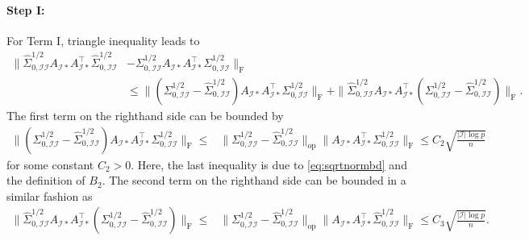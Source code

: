 \documentclass[11pt]{article}
\newcommand{\cI}{{\mathcal{I}}}
\newcommand{\0}{{\mathbf{0}}}
\newcommand{\op}{{\mathrm{op}}}
\begin{document}
\paragraph{Step I:} 
For Term I,
triangle inequality leads to
\begin{align*} 
 \|\widehat{\Sigma}_{0,\cI\cI}^{1/2}A_{\cI*}A^\top  _{\cI*}\widehat{\Sigma}_{0,\cI\cI}^{1/2} & -\Sigma_{0,\cI\cI}^{1/2}A_{\cI*}A^\top  _{\cI*}\Sigma_{0,\cI\cI}^{1/2}\|_\mathrm{F}\\
 & \leq \|(\Sigma_{0,\cI\cI}^{1/2}-\widehat{\Sigma}_{0,\cI\cI}^{1/2})A_{\cI*}A^\top  _{\cI*}\Sigma_{0,\cI\cI}^{1/2}\|_\mathrm{F} +\|\widehat{\Sigma}_{0,\cI\cI}^{1/2}A_{\cI*}A^\top_{\cI*}(\Sigma_{0,\cI\cI}^{1/2}-\widehat{\Sigma}_{0,\cI\cI}^{1/2})\|_\mathrm{F}.
\end{align*}
The first term on the righthand side can be bounded by \begin{align*}
    \|(\Sigma_{0,\cI\cI}^{1/2}-\widehat{\Sigma}_{0,\cI\cI}^{1/2})A_{\cI*}A^\top  _{\cI*}\Sigma_{0,\cI\cI}^{1/2}\|_\mathrm{F}\leq &\|\Sigma_{0,\cI\cI}^{1/2}-\widehat{\Sigma}_{0,\cI\cI}^{1/2}\|_{\op}\|A_{\cI*}A^\top_{\cI*}\Sigma_{0,\cI\cI}^{1/2}\|_\mathrm{F}
    \leq C_2\sqrt{\frac{|\cI|\log p}{n}}
\end{align*}
for some constant $C_2>0$.
Here, the last inequality is due to \eqref{eq:sqrtnormbd} and the definition of $B_2$. 
The second term on the righthand side can be bounded in a similar fashion as 
\begin{align*}
\|\widehat{\Sigma}_{0,\cI\cI}^{1/2}A_{\cI*}A^\top_{\cI*}(\Sigma_{0,\cI\cI}^{1/2}-\widehat{\Sigma}_{0,\cI\cI}^{1/2})\|_\mathrm{F}
      \leq &\|\Sigma_{0,\cI\cI}^{1/2}-\widehat{\Sigma}_{0,\cI\cI}^{1/2}\|_{\op}\|A_{\cI*}A^\top  _{\cI*}\widehat{\Sigma}_{0,\cI\cI}^{1/2}\|_\mathrm{F}
    \leq C_3\sqrt{\frac{|\cI|\log p}{n}}.
\end{align*}
\end{document}
